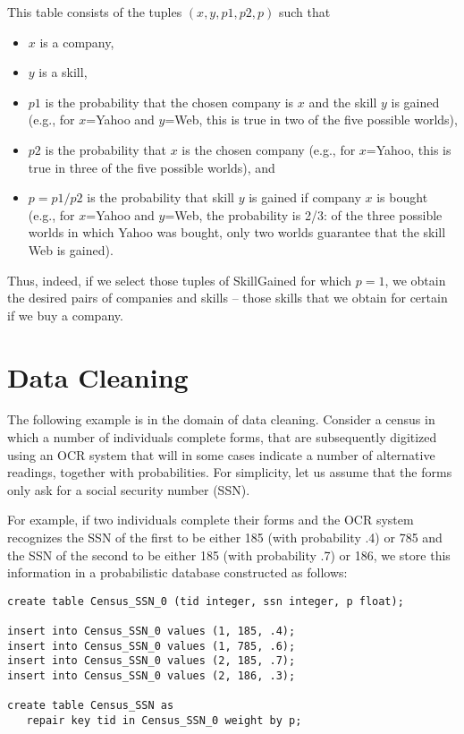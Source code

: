 This table consists of the tuples $(x,y, p1, p2, p)$ such that
\begin{itemize}
\item
$x$ is a company,

\item
$y$ is a skill,

\item
$p1$ is the probability that the chosen company is $x$ and the skill
$y$ is gained (e.g., for $x$=Yahoo and $y$=Web, this is true in two of the
five possible worlds),

\item
$p2$ is the probability that $x$ is the chosen company
(e.g., for $x$=Yahoo, this is true in three of the five possible worlds), and

\item
$p=p1/p2$ is the probability that skill $y$ is gained if company $x$ is bought
(e.g., for $x$=Yahoo and $y$=Web, the probability is 2/3: of the three possible
worlds in which Yahoo was bought, only two worlds guarantee that the skill
Web is gained).
\end{itemize}

Thus, indeed, if we select those tuples of SkillGained for which $p=1$, we
obtain the desired pairs of companies and skills -- those skills that we
obtain for certain if we buy a company.


\section{Data Cleaning}


The following example is in the domain of data cleaning. Consider a
census in which a number of individuals complete forms, that are subsequently
digitized using an OCR system that will in some cases indicate a number
of alternative readings, together with probabilities.
For simplicity, let us assume that the forms only ask for a social security
number (SSN).

For example, if two individuals complete their forms and the OCR system
recognizes the SSN of the first to be either 185 (with probability .4) or
785 and the SSN of the second to be either 185 (with probability .7) or
186, we store this information in a probabilistic database constructed as
follows: 
%
\begin{verbatim}
create table Census_SSN_0 (tid integer, ssn integer, p float);

insert into Census_SSN_0 values (1, 185, .4);
insert into Census_SSN_0 values (1, 785, .6);
insert into Census_SSN_0 values (2, 185, .7);
insert into Census_SSN_0 values (2, 186, .3);

create table Census_SSN as
   repair key tid in Census_SSN_0 weight by p;
\end{verbatim}

